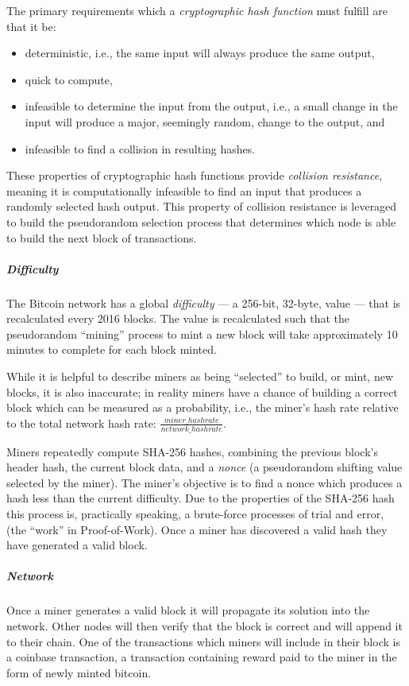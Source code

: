 The primary requirements which a \emph{cryptographic hash function} must fulfill
are that it be:

\begin{itemize}
  \item deterministic, i.e., the same input will always produce the same output,
  \item quick to compute,
  \item infeasible to determine the input from the output, i.e., a small change
    in the input will produce a major, seemingly random, change to the output,
    and
  \item infeasible to find a collision in resulting hashes.
\end{itemize}

These properties of cryptographic hash functions provide \emph{collision
resistance}, meaning it is computationally infeasible to find an input that
produces a randomly selected hash output. This property of collision resistance
is leveraged to build the pseudorandom selection process that determines which
node is able to build the next block of transactions.

\subparagraph{Difficulty}
The Bitcoin network has a global \emph{difficulty} --- a 256-bit,
32-byte, value --- that is recalculated every 2016 blocks. The value is
recalculated such that the pseudorandom ``mining'' process to mint a new block
will take approximately 10 minutes to complete for each block minted.

While it is helpful to describe miners as being ``selected'' to build, or mint,
new blocks, it is also inaccurate; in reality miners have a chance of building a
correct block which can be measured as a probability, i.e., the miner's hash
rate relative to the total network hash rate:
\(\frac{miner\_hashrate}{network\_hashrate}\).

Miners repeatedly compute SHA-256 hashes, combining the previous block's header
hash, the current block data, and a \emph{nonce} (a pseudorandom shifting value
selected by the miner). The miner's objective is to find a nonce which produces
a hash less than the current difficulty. Due to the properties of the SHA-256
hash this process is, practically speaking, a brute-force processes of trial and
error, (the ``work'' in Proof-of-Work). Once a miner has discovered a valid
hash they have generated a valid block.

\subparagraph{Network}
Once a miner generates a valid block it will propagate its solution into the
network. Other nodes will then verify that the block is correct and will append
it to their chain. One of the transactions which miners will include in their
block is a coinbase transaction, a transaction containing reward paid to the
miner in the form of newly minted bitcoin.

